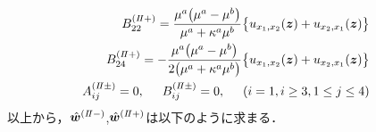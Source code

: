 \begin{align}
	\nonumber
	\\
	B_{22}^{(I\hspace{-.15em}I+)}=\frac{\mu^{a}\bigl(\mu^{a}-\mu^{b}\bigr)}{\mu^{a}+\kappa^{a}\mu^{b}}
	\bigl\{u_{x_{1},x_{2}}(\bm{z})+u_{x_{2},x_{1}}(\bm{z})\bigr\}&
	\nonumber\\
	B_{24}^{(I\hspace{-.15em}I+)}=-\frac{\mu^{a}\bigl(\mu^{a}-\mu^{b}\bigr)}{2\bigl(\mu^{a}+\kappa^{a}\mu^{b}\bigr)}
	\bigl\{u_{x_{1},x_{2}}(\bm{z})+u_{x_{2},x_{1}}(\bm{z})\bigr\}&
	\nonumber
	\\
	A_{ij}^{(I\hspace{-.15em}I\pm)}=0,\hspace{0.5cm}
	B_{ij}^{(I\hspace{-.15em}I\pm)}=0,\hspace{0.5cm}(i=1,i\geq3,1\leq j\leq4)
\end{align}
以上から，$\hat{\bm{w}}^{(I\hspace{-.15em}I-)}$,$\hat{\bm{w}}^{(I\hspace{-.15em}I+)}$は以下のように求まる．
